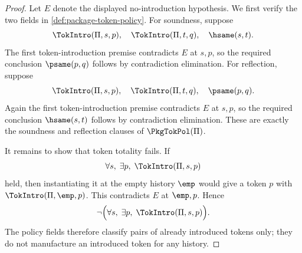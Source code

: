 \begin{proof}
Let $E$ denote the displayed no-introduction hypothesis. We first verify the two fields in \autoref{def:package-token-policy}. For soundness, suppose
$$
  \TokIntro(\Pi,s,p),\quad
  \TokIntro(\Pi,t,q),\quad
  \hsame(s,t).
$$
The first token-introduction premise contradicts $E$ at $s,p$, so the required conclusion $\psame(p,q)$ follows by contradiction elimination. For reflection, suppose
$$
  \TokIntro(\Pi,s,p),\quad
  \TokIntro(\Pi,t,q),\quad
  \psame(p,q).
$$
Again the first token-introduction premise contradicts $E$ at $s,p$, so the required conclusion $\hsame(s,t)$ follows by contradiction elimination. These are exactly the soundness and reflection clauses of $\PkgTokPol(\Pi)$.

It remains to show that token totality fails. If
$$
  \forall s,\;\exists p,\;\TokIntro(\Pi,s,p)
$$
held, then instantiating it at the empty history $\emp$ would give a token $p$ with $\TokIntro(\Pi,\emp,p)$. This contradicts $E$ at $\emp,p$. Hence
$$
  \neg\Bigl(\forall s,\;\exists p,\;\TokIntro(\Pi,s,p)\Bigr).
$$
The policy fields therefore classify pairs of already introduced tokens only; they do not manufacture an introduced token for any history.
\end{proof}

